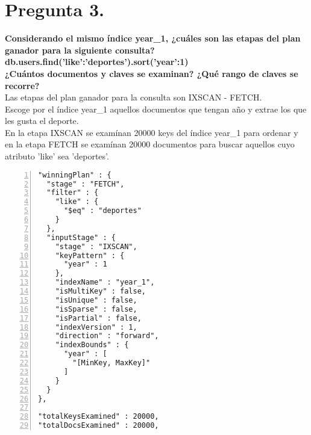 \documentclass{article}
\begin{document}
  \section{Pregunta 3.}
  \textbf{Considerando el mismo índice year\_1, ¿cuáles son las etapas del plan ganador para la siguiente consulta? \\
  db.users.find({'like':'deportes'}).sort({'year':1}) \\
  ¿Cuántos documentos y claves se examinan? ¿Qué rango de claves se recorre? \\}
  Las etapas del plan ganador para la consulta son IXSCAN - FETCH. \\
  Escoge por el índice year\_1 aquellos documentos que tengan año y extrae los que les gusta el deporte. \\
  En la etapa IXSCAN se examínan 20000 keys del índice year\_1 para ordenar y en la etapa FETCH se examínan 20000 documentos para buscar
  aquellos cuyo atributo 'like' sea 'deportes'.
    \begin{lstlisting}[numbers=left,frame=single]
"winningPlan" : {
  "stage" : "FETCH",
  "filter" : {
    "like" : {
      "$eq" : "deportes"
    }
  },
  "inputStage" : {
    "stage" : "IXSCAN",
    "keyPattern" : {
      "year" : 1
    },
    "indexName" : "year_1",
    "isMultiKey" : false,
    "isUnique" : false,
    "isSparse" : false,
    "isPartial" : false,
    "indexVersion" : 1,
    "direction" : "forward",
    "indexBounds" : {
      "year" : [
        "[MinKey, MaxKey]"
      ]
    }
  }
},

"totalKeysExamined" : 20000, 
"totalDocsExamined" : 20000,

    \end{lstlisting}


  \newpage
\end{document}

